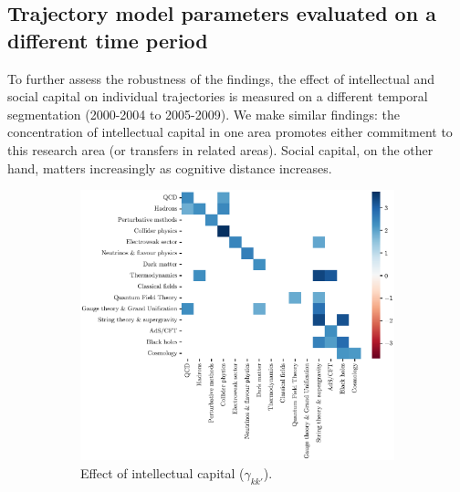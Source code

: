 \documentclass{article}
\begin{document}


\subsection{\label{appendix:model_parameters}Trajectory model parameters evaluated on a different time period}

To further assess the robustness of the findings, the effect of intellectual and social capital on individual trajectories is measured on a different temporal segmentation (2000-2004 to 2005-2009). We make similar findings: the concentration of intellectual capital in one area promotes either commitment to this research area (or transfers in related areas). Social capital, on the other hand, matters increasingly as cognitive distance increases.

\begin{figure}[H]
\begin{subfigure}{.5\textwidth}
    \includegraphics[width=1\textwidth]{Fig19a}
    \caption{Effect of intellectual capital ($\gamma_{kk'}$).}
    \label{fig:intellectual-capital-effect_2000-2009}
\end{subfigure}%
\begin{subfigure}{.5\textwidth}

\end{subfigure}
\end{figure}
\end{document}
